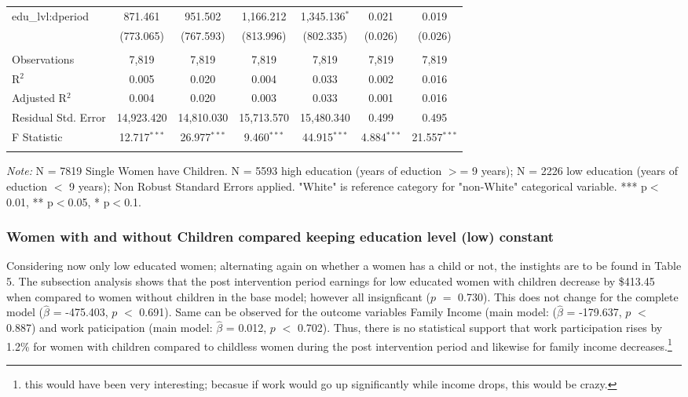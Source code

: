 \documentclass[a4paper]{article}
\begin{document}
\begin{table}[!htbp]
\begin{adjustwidth}{0.cm}{-0cm}
\begin{threeparttable}
\begin{tabular}{@{\extracolsep{-2pt}}lcccccc}
  edu\_lvl:dperiod & 871.461 & 951.502 & 1,166.212 & 1,345.136$^{*}$ & 0.021 & 0.019 \\ 
  & (773.065) & (767.593) & (813.996) & (802.335) & (0.026) & (0.026) \\ 
 \hline \\[-1.8ex] 
Observations & 7,819 & 7,819 & 7,819 & 7,819 & 7,819 & 7,819 \\ 
R$^{2}$ & 0.005 & 0.020 & 0.004 & 0.033 & 0.002 & 0.016 \\ 
Adjusted R$^{2}$ & 0.004 & 0.020 & 0.003 & 0.033 & 0.001 & 0.016 \\ 
Residual Std. Error & 14,923.420& 14,810.030 & 15,713.570 & 15,480.340  & 0.499  & 0.495 \\ 
F Statistic & 12.717$^{***}$  & 26.977$^{***}$ & 9.460$^{***}$ & 44.915$^{***}$  & 4.884$^{***}$  & 21.557$^{***}$  \\ 
\hline 
\hline \\[-3.5ex] 
\end{tabular} 
\begin{tablenotes}
      \small
      \item\textit{Note:} N = 7819 Single Women have Children. N = 5593 high education (years of eduction $>$= 9 years); N = 2226 low education (years of eduction $<$ 9 years); Non Robust Standard Errors applied. "White" is reference category for "non-White" categorical variable. *** p$<$0.01, ** p$<$0.05, * p$<$0.1.
    \end{tablenotes}
\end{threeparttable}
\end{adjustwidth}
%
\end{table}

\subsubsection{Women with and without Children compared keeping education level (low) constant}

Considering now only low educated women; alternating again on whether a women has a child or not, the instights are to be found in Table 5. 
The subsection analysis shows that the post intervention period earnings for low educated women with children decrease by \$413.45 when compared to women without children in the base model; however all insignficant ($p$ $=$ 0.730). This does not change for the complete model ($\hat{\beta}$ = -475.403, $p$ $<$ 0.691). Same can be observed for the outcome variables Family Income (main model: ($\hat{\beta}$ = -179.637, $p$ $<$ 0.887) and work paticipation (main model: $\hat{\beta}$ = 0.012, $p$ $<$ 0.702). Thus, there is no statistical support that work participation rises by 1.2\% for women with children compared to childless women during the post intervention period and likewise for family income decreases.\footnote{this would have been very interesting; becasue if work would go up significantly while income drops, this would be crazy.}
\end{document}
